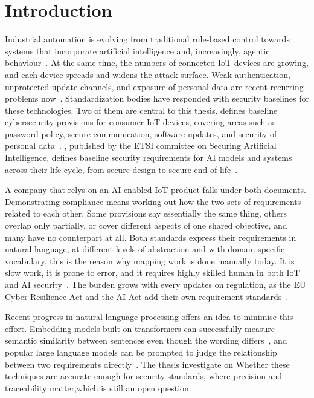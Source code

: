 \chapter{Introduction}\label{ch:introduction}

Industrial automation is evolving from traditional rule-based control towards
systems that incorporate artificial intelligence and, increasingly, agentic
behaviour~\cite{aslam2025industrial}. At the same time, the numbers of connected
IoT devices are growing, and each device spreads and widens the attack surface. Weak
authentication, unprotected update channels, and exposure of personal data are
recent recurring problems now~\cite{alotaibi2023iiot,meziane2023survey}. Standardization
bodies have responded with security baselines for these technologies. Two of
them are central to this thesis. \standardA{} defines baseline cybersecurity
provisions for consumer IoT devices, covering areas such as password policy,
secure communication, software updates, and security of personal
data~\cite{etsi303645}. \standardB{}, published by the ETSI committee on
Securing Artificial Intelligence, defines baseline security requirements for AI
models and systems across their life cycle, from secure design to secure end of
life~\cite{etsi304223}.

A company that relys on an AI-enabled IoT product falls under both documents.
Demonstrating compliance means working out how the two sets of
requirements related to each other. Some provisions say essentially the same thing, others
overlap only partially, or cover different aspects of one shared objective, and
many have no counterpart at all. Both standards express their requirements in
natural language, at different levels of abstraction and with
domain-specific vocabulary, this is the reason why mapping work is done manually today. It is
slow work, it is prone to error, and it requires highly skilled human in both IoT and AI
security~\cite{kosenkov2025systematic,djebbar2023comparative}. The burden grows
with every updates on regulation, as the EU Cyber Resilience Act and the AI Act
add their own requirement standards~\cite{canavese2026uncovering}.

Recent progress in natural language processing offers an idea to minimise this
effort. Embedding models built on transformers can successfully measure semantic similarity
between sentences even though the wording differs~\cite{devlin2019bert,
reimers2019sbert}, and popular large language models can be prompted to judge the
relationship between two requirements directly~\cite{rodriguez2024llm}. The thesis investigate on Whether these techniques are accurate enough for security standards, where precision and
traceability matter,which is still an open question. 

